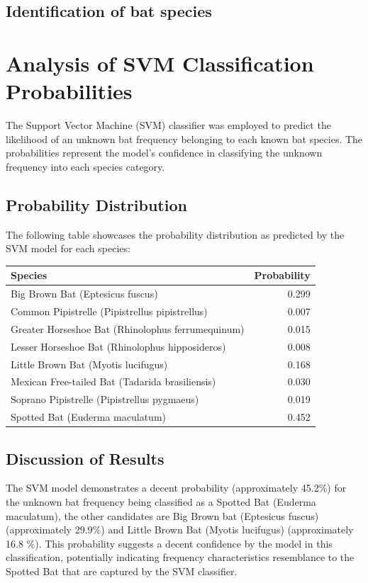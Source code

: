 \documentclass[12pt]{article}
\begin{document}
\subsection*{Identification of bat species}
\section{Analysis of SVM Classification Probabilities}

The Support Vector Machine (SVM) classifier was employed to predict the likelihood of an unknown bat frequency belonging to each known bat species. The probabilities represent the model's confidence in classifying the unknown frequency into each species category.

\subsection{Probability Distribution}
The following table showcases the probability distribution as predicted by the SVM model for each species:

\begin{center}
\begin{tabular}{lr}
\toprule
Species & Probability \\
\midrule
Big Brown Bat (Eptesicus fuscus) & 0.299 \\
Common Pipistrelle (Pipistrellus pipistrellus) & 0.007 \\
Greater Horseshoe Bat (Rhinolophus ferrumequinum) & 0.015 \\
Lesser Horseshoe Bat (Rhinolophus hipposideros) & 0.008 \\
Little Brown Bat (Myotis lucifugus) & 0.168 \\
Mexican Free-tailed Bat (Tadarida brasiliensis) & 0.030 \\
Soprano Pipistrelle (Pipistrellus pygmaeus) & 0.019 \\
Spotted Bat (Euderma maculatum) & 0.452 \\
\bottomrule
\end{tabular}
\end{center}

\subsection{Discussion of Results}
The SVM model demonstrates a decent probability (approximately 45.2\%) for the unknown bat frequency being classified as a Spotted Bat (Euderma maculatum), the other candidates are Big Brown bat (Eptesicus fuscus) (approximately 29.9\%) and Little Brown Bat (Myotis lucifugus) (approximately 16.8 \%). This probability suggests a decent confidence by the model in this classification, potentially indicating frequency characteristics resemblance to the Spotted Bat that are captured by the SVM classifier.
\end{document}
